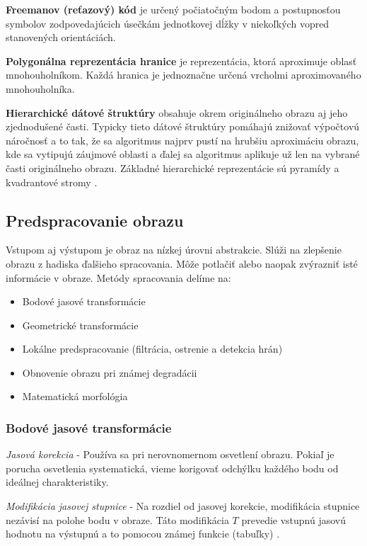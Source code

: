 \begin{itemize}
\textbf{Freemanov (reťazový) kód}  je určený počiatočným bodom a postupnosťou symbolov zodpovedajúcich úsečkám jednotkovej dĺžky v niekoľkých vopred stanovených orientáciách. 

\textbf{Polygonálna reprezentácia hranice} je reprezentácia, ktorá aproximuje oblasť mnohouholníkom. Každá hranica je jednoznačne určená vrcholmi aproximovaného mnohouholníka.

\textbf{Hierarchické dátové štruktúry} obsahuje okrem originálneho obrazu aj jeho zjednodušené časti. Typicky tieto dátové štruktúry pomáhajú znižovať výpočtovú náročnosť a to tak, že sa algoritmus najprv pustí na hrubšiu aproximáciu obrazu, kde sa vytipujú záujmové oblasti a ďalej sa algoritmus aplikuje už len na vybrané časti originálneho obrazu. Základné hierarchické reprezentácie sú pyramídy a kvadrantové stromy \cite{počítačové_videnie_v_praxi}. 

\end{itemize}



\subsection{Predspracovanie obrazu}
Vstupom aj výstupom je obraz na nízkej úrovni abstrakcie. Slúži na zlepšenie obrazu z hadiska ďalšieho spracovania. Môže potlačiť alebo naopak zvýrazniť isté informácie v obraze.\cite{pocitacove_videnie_v_praxi} Metódy spracovania delíme na: 
\begin{itemize}
\item Bodové jasové transformácie
\item Geometrické transformácie
\item Lokálne predspracovanie (filtrácia, ostrenie a detekcia hrán)
\item Obnovenie obrazu pri známej degradácii 
\item Matematická morfológia 
\end{itemize}

\subsubsection{Bodové jasové transformácie}

\textit{Jasová korekcia} - Používa sa pri nerovnomernom osvetlení obrazu. Pokiaľ je porucha
osvetlenia systematická, vieme korigovať odchýlku každého bodu od ideálnej charakteristiky.

\textit{Modifikácia jasovej stupnice} - Na rozdiel od jasovej korekcie, modifikácia stupnice nezávisí na polohe bodu v obraze. Táto modifikácia $T$ prevedie vstupnú jasovú hodnotu na výstupnú a to pomocou známej funkcie (tabuľky) \cite{pocitacove_videnie_v_praxi}. 


